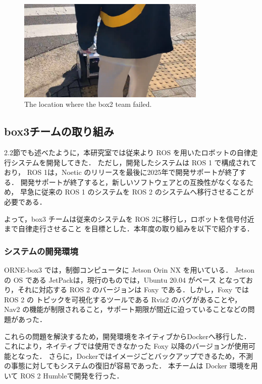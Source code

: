 \documentclass[twocolumn, 9pt]{jsproceedings}
\begin{document}
\begin{figure}[h!]
  \centering
  \includegraphics[width=90mm]{fig/result_box2_cut.pdf}
  \caption{The location where the box2 team failed.}
  \label{fig:box2-result}
\end{figure}

\subsection{box3チームの取り組み}
2.2節でも述べたように，本研究室では従来より ROS を用いたロボットの自律走行システムを開発してきた．
ただし，開発したシステムは ROS 1 で構成されており，
ROS 1は，Noetic\cite{noetic} のリリースを最後に2025年で開発サポートが終了する．
開発サポートが終了すると，新しいソフトウェアとの互換性がなくなるため，
早急に従来の ROS 1 のシステムを ROS 2 \cite{ros2}のシステムへ移行させることが必要である．

よって，box3 チームは従来のシステムを ROS 2に移行し，ロボットを信号付近まで自律走行させること
を目標とした．本年度の取り組みを以下で紹介する．

\subsubsection{システムの開発環境}
ORNE-box3 では，制御コンピュータに Jetson Orin NX を用いている．
Jetson の OS である JetPack\cite{JetPack}は，現行のものでは，Ubuntu 20.04\cite{ubuntu} がベース
となっており，それに対応する ROS 2 のバージョンは Foxy\cite{foxy} である．しかし，Foxy では ROS 2 の
トピックを可視化するツールである Rviz2\cite{rviz2} のバグ\cite{rviz-bag}があることや，
Nav2\cite{nav2} の機能が制限されること，サポート期限が間近に迫っていることなどの問題があった．

これらの問題を解決するため，開発環境をネイティブからDocker\cite{Docker}へ移行した．
これにより，ネイティブでは使用できなかった Foxy 以降のバージョンが使用可能となった．
さらに，Dockerではイメージごとバックアップできるため，不測の事態に対してもシステムの復旧が容易であった．
本チームは Docker 環境を用いて ROS 2 Humble\cite{humble}で開発を行った．
\end{document}
